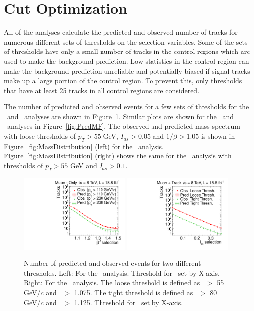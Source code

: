 \section{Cut Optimization \label{sec:Optim}}
All of the analyses calculate the predicted and observed number of tracks for numerous different sets of thresholds on the selection variables.
Some of the sets of thresholds have only a small number of tracks in the control regions which are used to make the background prediction.
Low statistics in the control region can make the background prediction unreliable and potentially biased if signal tracks make up a large portion of the control region.
To prevent this, only thresholds that have at least 25 tracks in all control regions are considered. 

The number of predicted and observed events for a few sets of thresholds for the \muononly\ and \tktof\ analyses are shown in Figure~\ref{fig:PredPt230}. 
Similar plots are shown for the \tkonly\ and \multi\ analyses in Figure~\ref{fig:PredMF}.
The observed and predicted mass spectrum with loose thresholds of $p_T > 55$ GeV, $I_{as}>0.05$ and $1/\beta>1.05$ is shown in Figure~\ref{fig:MassDistribution} (left)
for the \tktof\ analysis. Figure~\ref{fig:MassDistribution} (right) shows the same for the \tkonly\ analysis with thresholds of $p_T > 55$ GeV and $I_{as}>0.1$.

\begin{figure}
\centering
  \includegraphics[clip=false, trim=0.0cm 0cm 0.0cm 0cm, width=0.48\textwidth]{figures/muonly/Prediction_Data8TeV_NPredVsNObs}
  \includegraphics[clip=false, trim=0.0cm 0cm 0.0cm 0cm, width=0.48\textwidth]{figures/tkmu/Prediction_Data8TeV_NPredVsNObs}
  \caption[Number of predicted and observed events for two different thresholds in the \muononly\ and \tktof\ analyses.]
{Number of predicted and observed events for two different thresholds. 
Left: For the \muononly\ analysis. Threshold for \invbeta\ set by X-axis.
Right: For the \tktof\ analysis. The loose threshold is defined as \pt\ $>$ 55 GeV/$c$ and \invbeta\ $>$ 1.075.
The tight threshold is defined as \pt\ $>$ 80 GeV/$c$ and \invbeta\ $>$ 1.125.  Threshold for \ias\ set by X-axis.}
    \label{fig:PredPt230}
\end{figure}

